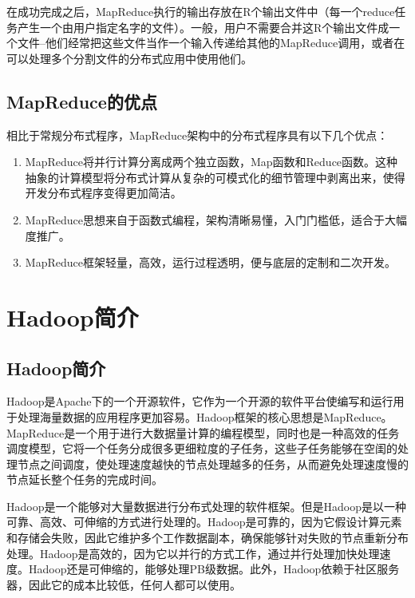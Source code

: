 在成功完成之后，MapReduce执行的输出存放在R个输出文件中（每一个reduce任务产生一个由用户指定名字的文件）。一般，用户不需要合并这R个输出文件成一个文件--他们经常把这些文件当作一个输入传递给其他的MapReduce调用，或者在可以处理多个分割文件的分布式应用中使用他们。

\subsection{MapReduce的优点}
相比于常规分布式程序，MapReduce架构中的分布式程序具有以下几个优点：
\begin{enumerate}

\item MapReduce将并行计算分离成两个独立函数，Map函数和Reduce函数。这种抽象的计算模型将分布式计算从复杂的可模式化的细节管理中剥离出来，使得开发分布式程序变得更加简洁。

\item MapReduce思想来自于函数式编程，架构清晰易懂，入门门槛低，适合于大幅度推广。

\item MapReduce框架轻量，高效，运行过程透明，便与底层的定制和二次开发。

\end{enumerate}


\section[Hadoop简介]{Hadoop简介\cite{book:Hadoop}}

\subsection{Hadoop简介}
Hadoop是Apache下的一个开源软件，它作为一个开源的软件平台使编写和运行用于处理海量数据的应用程序更加容易。Hadoop框架的核心思想是MapReduce。MapReduce是一个用于进行大数据量计算的编程模型，同时也是一种高效的任务调度模型，它将一个任务分成很多更细粒度的子任务，这些子任务能够在空闺的处理节点之间调度，使处理速度越快的节点处理越多的任务，从而避免处理速度慢的节点延长整个任务的完成时间。

Hadoop是一个能够对大量数据进行分布式处理的软件框架。但是Hadoop是以一种可靠、高效、可伸缩的方式进行处理的。Hadoop是可靠的，因为它假设计算元素和存储会失败，因此它维护多个工作数据副本，确保能够针对失败的节点重新分布处理。Hadoop是高效的，因为它以并行的方式工作，通过并行处理加快处理速度。Hadoop还是可伸缩的，能够处理PB级数据。此外，Hadoop依赖于社区服务器，因此它的成本比较低，任何人都可以使用。

